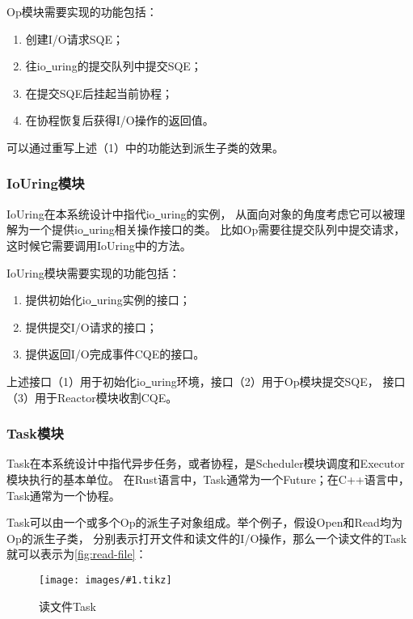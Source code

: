 \documentclass[supercite]{HustGraduPaper}
\newcommand{\cfig}[3]{
  \begin{figure}[htb]
    \centering
    \texttt{[image: images/\#1.tikz]}
    \caption{#3}
    \label{fig:#1}
  \end{figure}
}
\newcommand{\rfig}[1]{\autoref{fig:#1}}
\theoremstyle{definition}
\begin{document}
Op模块需要实现的功能包括：

\begin{enumerate}
  \item 创建I/O请求SQE；
  \item 往io\underline{~}uring的提交队列中提交SQE；
  \item 在提交SQE后挂起当前协程；
  \item 在协程恢复后获得I/O操作的返回值。
\end{enumerate}

可以通过重写上述（1）中的功能达到派生子类的效果。\par

\subsubsection{IoUring模块}

IoUring在本系统设计中指代io\underline{~}uring的实例，
从面向对象的角度考虑它可以被理解为一个提供io\underline{~}uring相关操作接口的类。
比如Op需要往提交队列中提交请求，这时候它需要调用IoUring中的方法。\par

IoUring模块需要实现的功能包括：

\begin{enumerate}
  \item 提供初始化io\underline{~}uring实例的接口；
  \item 提供提交I/O请求的接口；
  \item 提供返回I/O完成事件CQE的接口。
\end{enumerate}

上述接口（1）用于初始化io\underline{~}uring环境，接口（2）用于Op模块提交SQE，
接口（3）用于Reactor模块收割CQE。\par

\subsubsection{Task模块}

Task在本系统设计中指代异步任务，或者协程，是Scheduler模块调度和Executor模块执行的基本单位。
在Rust语言中，Task通常为一个Future；在C++语言中，Task通常为一个协程。\par

Task可以由一个或多个Op的派生子对象组成。举个例子，假设Open和Read均为Op的派生子类，
分别表示打开文件和读文件的I/O操作，那么一个读文件的Task就可以表示为\rfig{read-file}：

\cfig{read-file}{0.4}{读文件Task}
\end{document}
